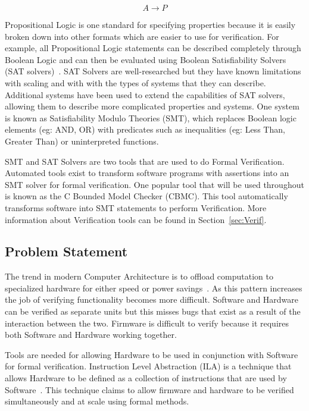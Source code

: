 \documentclass[../report.tex]{subfiles}
\begin{document}
\begin{equation}
    A \to P
\end{equation}

Propositional Logic is one standard for specifying properties because it is easily
broken down into other formats which are easier to use for verification.
For example, all Propositional Logic statements can be described completely
through Boolean Logic and can then be evaluated using Boolean Satisfiability
Solvers (SAT solvers)~\cite{validating-sat}. SAT Solvers are well-researched but
they have known limitations with scaling and with with the types of systems that
they can describe.
Additional systems have been used to extend the capabilities of SAT solvers, allowing them to describe more complicated properties and systems. 
One system is known as Satisfiability Modulo Theories (SMT), which replaces
Boolean logic elements (eg: AND, OR) with predicates such as inequalities (eg:
Less Than, Greater Than) or uninterpreted functions. 

SMT and SAT Solvers are two tools that are used to do Formal Verification. 
Automated tools exist to transform software programs with
assertions into an SMT solver for formal verification. 
One popular tool that will be used throughout is known as the C Bounded Model Checker (CBMC). 
This tool automatically transforms software into SMT statements to perform
Verification.
More information about Verification tools can be found in
Section~\ref{sec:Verif}. 


\subsection{Problem Statement}

The trend in modern Computer Architecture is to offload computation to specialized hardware for either speed or power savings~\cite{hardware-accel}.
As this pattern increases the job of verifying functionality becomes more difficult.
Software and Hardware can be verified as separate units but this misses bugs
that exist as a result of the interaction between the two.
Firmware is difficult to verify because it requires both Software and Hardware
working together.

Tools are needed for allowing Hardware to be used in conjunction with Software for formal verification.
Instruction Level Abstraction (ILA) is a technique that allows Hardware to
be defined as a collection of instructions that are used by Software~\cite{ila}.
This technique claims to allow firmware and hardware to be verified simultaneously and at scale using formal methods.
\end{document}
